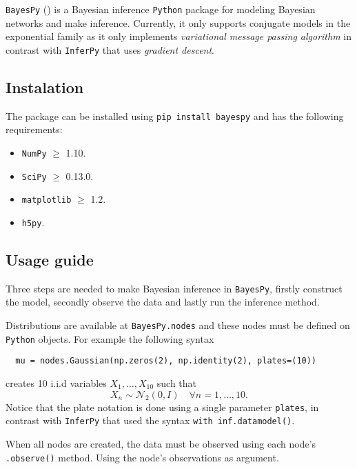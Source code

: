 
\texttt{BayesPy} (\cite{BayesPy}) is a Bayesian inference \texttt{Python} package for modeling Bayesian networks and make inference. Currently, it only supports conjugate models in the exponential family as it only implements \emph{variational message passing algorithm} in contrast with \texttt{InferPy} that uses \emph{gradient descent}.

\subsection{Instalation}

The package can be installed using \texttt{pip install bayespy} and has the following requirements:
\begin{itemize}
  \item \texttt{NumPy} \(\geq\) 1.10.
  \item \texttt{SciPy} \(\geq\) 0.13.0.
  \item \texttt{matplotlib} \(\geq\) 1.2.
  \item \texttt{h5py}.
\end{itemize}

\subsection{Usage guide}

Three steps are needed to make Bayesian inference in \texttt{BayesPy}, firstly construct the model, secondly observe the data and lastly run the inference method.

Distributions are available at \texttt{BayesPy.nodes} and these nodes must be defined on \texttt{Python} objects. For example the following syntax
\begin{verbatim}
  mu = nodes.Gaussian(np.zeros(2), np.identity(2), plates=(10))
\end{verbatim}
creates 10 i.i.d variables \(X_{1},\dots,X_{10}\)  such that
\[
  X_{n} \sim \mathcal{N}_{2}(0, I) \quad \forall n =1,\dots,10.
\]
Notice that the plate notation is done using a single parameter \texttt{plates}, in contrast with \texttt{InferPy} that used the syntax \texttt{with inf.datamodel()}.

When all nodes are created, the data must be observed using each node's \texttt{.observe()} method. Using the node's observations as argument.

